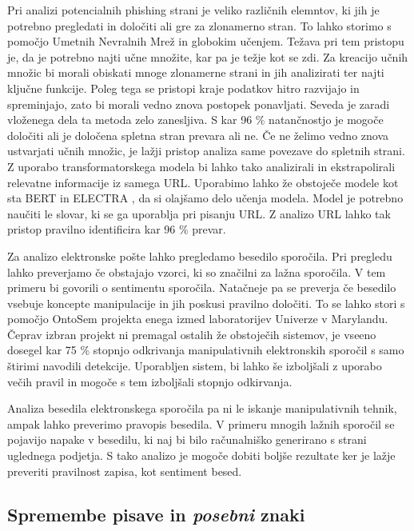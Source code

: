 \documentclass[sigconf,nonacm]{acmart}
\begin{document}
Pri analizi potencialnih phishing strani je veliko različnih elemntov, ki jih je potrebno pregledati in določiti ali gre za zlonamerno stran. To lahko storimo s pomočjo Umetnih Nevralnih Mrež in globokim učenjem. Težava pri tem pristopu je, da je potrebno najti učne množite, kar pa je težje kot se zdi. Za kreacijo učnih množic bi morali obiskati mnoge zlonamerne strani in jih analizirati ter najti ključne funkcije. Poleg tega se pristopi kraje podatkov hitro razvijajo in spreminjajo, zato bi morali vedno znova postopek ponavljati. Seveda je zaradi vloženega dela ta metoda zelo zanesljiva. S kar 96 \% natančnostjo je mogoče določiti ali je določena spletna stran prevara ali ne.  Če ne želimo vedno znova ustvarjati učnih množic, je lažji pristop analiza same povezave do spletnih strani. Z uporabo transformatorskega modela bi lahko tako analizirali in ekstrapolirali relevatne informacije iz samega URL. Uporabimo lahko že obstoječe modele kot sta BERT \cite{devlin2018bert} in ELECTRA \cite{clark2020electra}, da si olajšamo delo učenja modela. Model je potrebno naučiti le slovar, ki se ga uporablja pri pisanju URL. Z analizo URL lahko tak pristop pravilno identificira kar 96 \% prevar. \cite{HAYNES2021127}

Za analizo elektronske pošte lahko pregledamo besedilo sporočila. Pri pregledu lahko preverjamo če obstajajo vzorci, ki so značilni za lažna sporočila. V tem primeru bi govorili o sentimentu sporočila. Natačneje pa se preverja če besedilo vsebuje koncepte manipulacije in jih poskusi pravilno določiti. To se lahko stori s pomočjo OntoSem projekta enega izmed laboratorijev Univerze v Marylandu. Čeprav izbran projekt ni premagal ostalih že obstoječih sistemov, je vseeno dosegel kar 75 \% stopnjo odkrivanja manipulativnih elektronskih sporočil s samo štirimi navodili detekcije. Uporabljen sistem, bi lahko še izboljšali z uporabo večih pravil in mogoče s tem izboljšali stopnjo odkirvanja. \cite{stone2007ebids}

Analiza besedila elektronskega sporočila pa ni le iskanje manipulativnih tehnik, ampak lahko preverimo pravopis besedila. V primeru mnogih lažnih sporočil se pojavijo napake v besedilu, ki naj bi bilo računalniško generirano s strani uglednega podjetja. S tako analizo je mogoče dobiti boljše rezultate ker je lažje preveriti pravilnost zapisa, kot sentiment besed.

\subsection{Spremembe pisave in \emph{posebni} znaki}
\end{document}
